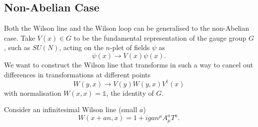 
\subsection{Non-Abelian Case}%
\label{sub:non_abelian}

Both the Wilson line and the Wilson loop can be generalised to the non-Abelian case.
Take $V(x) \in G$ to be the fundamental representation of the gauge group $G$, such as $SU(N)$, acting on the $n$-plet of fields $\psi$ as
\begin{equation}
  \psi(x) \to V(x) \psi(x).
\end{equation}
We want to construct the Wilson line that transforms in such a way to cancel out differences in transformations at different points
\begin{equation}
  \label{eq:20-nonabelian}
  W(y, x) \to V(y) W(y, x) V^{\dagger}(x)
\end{equation}
with normalisation $W(x, x) = \mathbb{1}$, the identity of $G$.

Consider an infinitesimal Wilson line (small $a$)
\begin{equation}
  W(x + an, x) = 1 + i g a n^{\mu} A_{\mu}^{a} T^{a}.
\end{equation}

